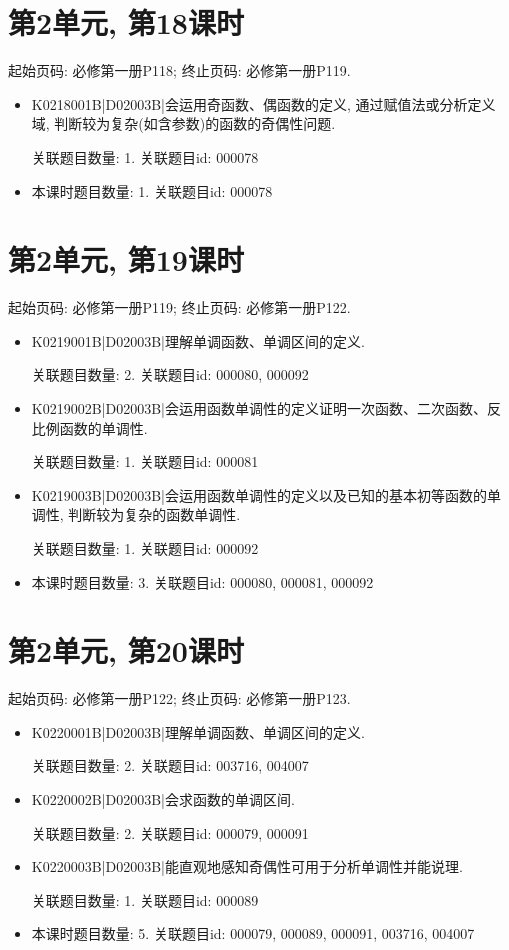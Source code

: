 \section*{第2单元, 第18课时}
起始页码: 必修第一册P118; 终止页码: 必修第一册P119.
\begin{itemize}
\item K0218001B|D02003B|会运用奇函数、偶函数的定义, 通过赋值法或分析定义域, 判断较为复杂(如含参数)的函数的奇偶性问题.

关联题目数量: 1. 关联题目id: 000078

\item 本课时题目数量: 1. 关联题目id: 000078

\end{itemize}

\section*{第2单元, 第19课时}
起始页码: 必修第一册P119; 终止页码: 必修第一册P122.
\begin{itemize}
\item K0219001B|D02003B|理解单调函数、单调区间的定义.

关联题目数量: 2. 关联题目id: 000080, 000092

\item K0219002B|D02003B|会运用函数单调性的定义证明一次函数、二次函数、反比例函数的单调性.

关联题目数量: 1. 关联题目id: 000081

\item K0219003B|D02003B|会运用函数单调性的定义以及已知的基本初等函数的单调性, 判断较为复杂的函数单调性.

关联题目数量: 1. 关联题目id: 000092

\item 本课时题目数量: 3. 关联题目id: 000080, 000081, 000092

\end{itemize}

\section*{第2单元, 第20课时}
起始页码: 必修第一册P122; 终止页码: 必修第一册P123.
\begin{itemize}
\item K0220001B|D02003B|理解单调函数、单调区间的定义.

关联题目数量: 2. 关联题目id: 003716, 004007

\item K0220002B|D02003B|会求函数的单调区间.

关联题目数量: 2. 关联题目id: 000079, 000091

\item K0220003B|D02003B|能直观地感知奇偶性可用于分析单调性并能说理.

关联题目数量: 1. 关联题目id: 000089

\item 本课时题目数量: 5. 关联题目id: 000079, 000089, 000091, 003716, 004007

\end{itemize}


